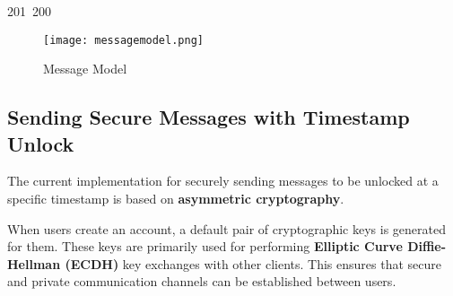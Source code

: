 201~200~\documentclass{article}
\begin{document}
	                                                                                                                                                                                                \begin{figure}[ht]
	                                                                                                                                                                                                    \centering
	                                                                                                                                                                                                        \texttt{[image: messagemodel.png]}
	                                                                                                                                                                                                            \caption{Message Model}
	                                                                                                                                                                                                                \label{fig:enter-label}
	                                                                                                                                                                                                                \end{figure}

	                                                                                                                                                                                                                \subsection{Sending Secure Messages with Timestamp Unlock}

	                                                                                                                                                                                                                The current implementation for securely sending messages to be unlocked at a specific timestamp is based on \textbf{asymmetric cryptography}.  

	                                                                                                                                                                                                                When users create an account, a default pair of cryptographic keys is generated for them. These keys are primarily used for performing \textbf{Elliptic Curve Diffie-Hellman (ECDH)} key exchanges with other clients. This ensures that secure and private communication channels can be established between users.
\end{document}
